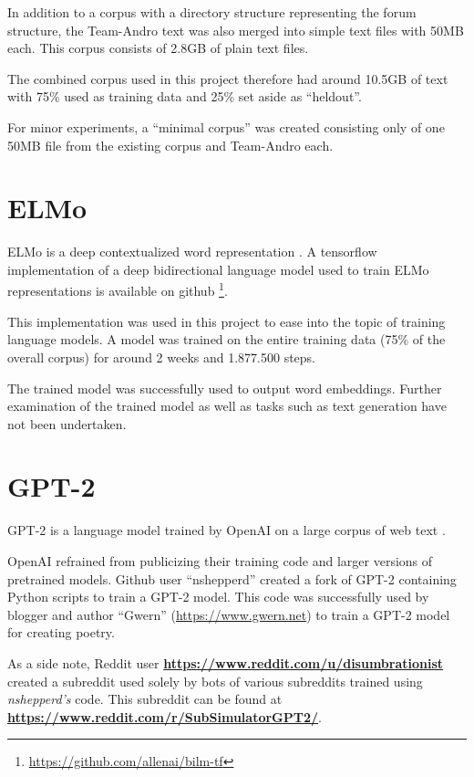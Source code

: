 \documentclass{scrartcl}
\newcommand{\burl}[1]{\textbf{\url{#1}}}
\begin{document}
In addition to a corpus with a directory structure representing the forum structure, the Team-Andro text was also merged into simple text files with 50MB each. This corpus consists of 2.8GB of plain text files.

The combined corpus used in this project therefore had around 10.5GB of text with 75\% used as training data and 25\% set aside as \enquote{heldout}.

For minor experiments, a \enquote{minimal corpus} was created consisting only of one 50MB file from the existing corpus and Team-Andro each.



\section{ELMo}

ELMo is a deep contextualized word representation \cite{Peters:2018}. A tensorflow implementation of a deep bidirectional language model used to train ELMo representations is available on github \footnote{\url{https://github.com/allenai/bilm-tf}}.

This implementation was used in this project to ease into the topic of training language models. A model was trained on the entire training data (75\% of the overall corpus) for around 2 weeks and 1.877.500 steps.

The trained model was successfully used to output word embeddings. Further examination of the trained model as well as tasks such as text generation have not been undertaken.


\section{GPT-2}
GPT-2 is a language model trained by OpenAI on a large corpus of web text \cite{radford2019language}.

OpenAI refrained from publicizing their training code and larger versions of pretrained models.
Github user \enquote{nshepperd} created a fork of GPT-2 containing Python scripts to train a GPT-2 model. This code was successfully used by blogger and author \enquote{Gwern} (\url{https://www.gwern.net}) to train a GPT-2 model for creating poetry.

As a side note, Reddit user \burl{https://www.reddit.com/u/disumbrationist} created a subreddit used solely by bots of various subreddits trained using \textit{nshepperd's} code. This subreddit can be found at \burl{https://www.reddit.com/r/SubSimulatorGPT2/}.
\end{document}
